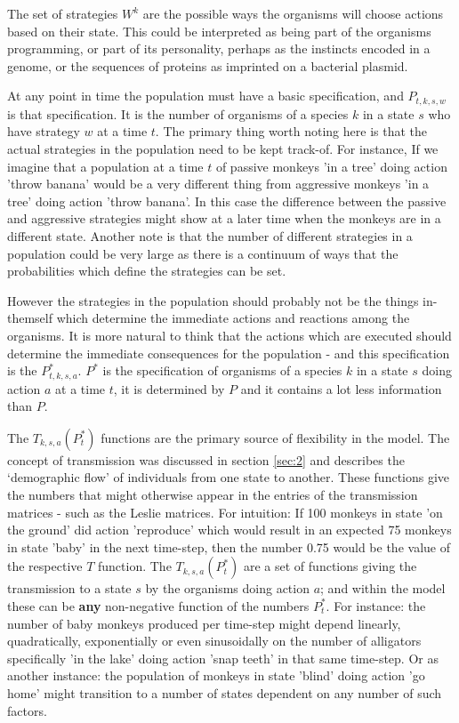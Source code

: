 The set of strategies $W^k$ are the possible ways the organisms will choose actions based on their state. This could be interpreted as being part of the organisms programming, or part of its personality, perhaps as the instincts encoded in a genome, or the sequences of proteins as imprinted on a bacterial plasmid.

At any point in time the population must have a basic specification, and $P_{t,k,s,w}$ is that specification. It is the number of organisms of a species $k$ in a state $s$ who have strategy $w$ at a time $t$. The primary thing worth noting here is that the actual strategies in the population need to be kept track-of. For instance, If we imagine that a population at a time $t$ of passive monkeys 'in a tree' doing action 'throw banana' would be a very different thing from aggressive monkeys 'in a tree' doing action 'throw banana'. In this case the difference between the passive and aggressive strategies might show at a later time when the monkeys are in a different state. Another note is that the number of different strategies in a population could be very large as there is a continuum of ways that the probabilities which define the strategies can be set.

However the strategies in the population should probably not be the things in-themself which determine the immediate actions and reactions among the organisms. It is more natural to think that the actions which are executed should determine the immediate consequences for the population - and this specification is the $P^*_{t,k,s,a}$.
$P^*$ is the specification of organisms of a species $k$ in a state $s$ doing action $a$ at a time $t$, it is determined by $P$ and it contains a lot less information than $P$.

The $T_{k,s,a}(P^*_t)$ functions are the primary source of flexibility in the model. The concept of transmission was discussed in section \ref{sec:2} and describes the `demographic flow' of individuals from one state to another. These functions give the numbers that might otherwise appear in the entries of the transmission matrices - such as the Leslie matrices.
For intuition: If 100 monkeys in state 'on the ground' did action 'reproduce' which would result in an expected 75 monkeys in state 'baby' in the next time-step, then the number 0.75 would be the value of the respective $T$ function. The $T_{k,s,a}(P^*_t)$ are a set of functions giving the transmission to a state $s$ by the organisms doing action $a$; and within the model these can be \textbf{any} non-negative function of the numbers $P^*_{t}$. For instance: the number of baby monkeys produced per time-step might depend linearly, quadratically, exponentially or even sinusoidally on the number of alligators specifically 'in the lake' doing action 'snap teeth' in that same time-step. Or as another instance: the population of monkeys in state 'blind' doing action 'go home' might transition to a number of states dependent on any number of such factors.

